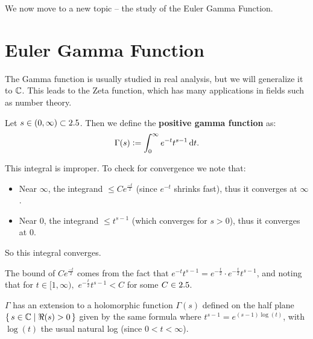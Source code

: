We now move to a new topic -- the study of the Euler Gamma Function.

\section{Euler Gamma Function}

The Gamma function is usually studied in real analysis, but we will generalize it to $\mathbb{C}$. This leads to the Zeta function, which has many applications in fields such as number theory.

\begin{definition}

Let $s \in (0,\infty) \subset 2.5$. Then we define the \textbf{positive gamma function} as:
\begin{align*}
    \Gamma(s) \defas \int_0^\infty e^{-t} t^{s-1} \dif t.
\end{align*}

\end{definition}

\begin{remark}
This integral is improper. To check for convergence we note that: 
\begin{itemize}
    \item Near $\infty$, the integrand $\leq C e^{\frac{-t}{2}}$ (since $e^{-t}$ shrinks fast), thus it converges at $\infty$.
    \item Near $0$,  the integrand $\leq t^{s-1}$ (which converges for $s>0$), thus it converges at $0$.
\end{itemize}
So this integral converges.

\end{remark}

\begin{note}
The bound of $C e^{\frac{-t}{2}}$ comes from the fact that $e^{-t} t^{s-1} = e^{-\frac{t}{2}} \cdot e^{-\frac{t}{2}} t^{s-1}$, and noting that for $t \in [1,\infty),$ $e^{-\frac{t}{2}} t^{s-1} < C$ for some $C \in 2.5$.
\end{note}


\begin{proposition}\label{prop:g-extension}
$\Gamma$ has an extension to a holomorphic function $\Gamma(s)$ defined on the half plane $\set{ s \in \mathbb{C}\mid \Re(s) > 0}$ given by the same formula where $t^{s-1} = e^{(s-1) \log(t)}$, with $\log(t)$ the usual natural log (since $0 < t < \infty$).
\end{proposition}


